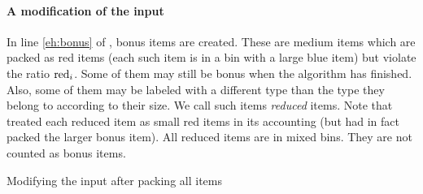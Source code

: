 \paragraph{A modification of the input}
\label{sec:mod}
In line \ref{eh:bonus} of {\EHarm}, bonus items are created. These are medium items which are packed as red items (each such item is in a bin with a large blue item) but violate the ratio $\mathrm{red}_i$. 
Some of them may still be bonus when the algorithm has finished. 
Also, some of them may be
labeled with a different type than the type they belong to according to their size. 
We call such items \emph{reduced} items. Note that {\EHarm} treated each reduced item as small red items in its accounting (but had in fact packed the larger bonus item).
All reduced items are in mixed bins. They are not counted as bonus items.

\begin{algorithm}[ht]
\caption{\label{alg:mod}
Modifying the input after packing all items}
\begin{algorithmic}[1]
	\label{mod:doit-next}
	\label{mod:shrink-large}
	\label{mod:13}
\EndFor
\end{algorithmic}
\end{algorithm}

